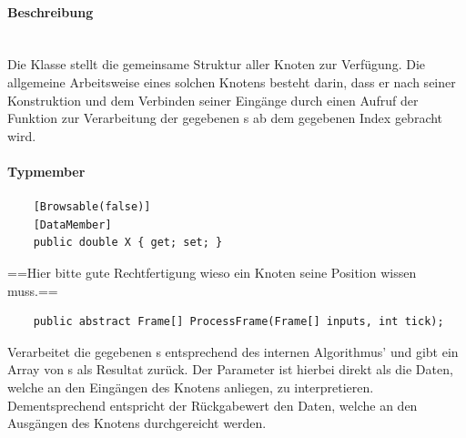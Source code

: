 \paragraph{Beschreibung}~\\
Die Klasse  stellt die gemeinsame Struktur aller Knoten zur Verfügung. Die allgemeine Arbeitsweise eines solchen Knotens besteht darin, dass er nach seiner Konstruktion und dem Verbinden seiner Eingänge durch einen Aufruf der Funktion  zur Verarbeitung der gegebenen s ab dem gegebenen Index gebracht wird.

\paragraph{Typmember}
\begin{itemize}

	\begin{verbatim}
	[Browsable(false)]
	[DataMember]
	public double X { get; set; }
	\end{verbatim}
	==Hier bitte gute Rechtfertigung wieso ein Knoten seine Position wissen muss.==


	\begin{verbatim}
	public abstract Frame[] ProcessFrame(Frame[] inputs, int tick);
	\end{verbatim}
	Verarbeitet die gegebenen s entsprechend des internen Algorithmus' und gibt ein Array von s als Resultat zurück. Der Parameter  ist hierbei direkt als die Daten, welche an den Eingängen des Knotens anliegen, zu interpretieren. Dementsprechend entspricht der Rückgabewert den Daten, welche an den Ausgängen des Knotens durchgereicht werden.


\end{itemize}


